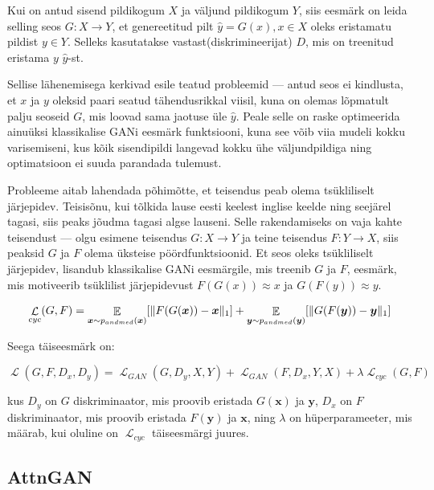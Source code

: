 \documentclass{vilgym}
\DeclareMathOperator{\EX}{\mathbb{E}}
\DeclareMathOperator{\loss}{\mathcal{L}}
\DeclarePairedDelimiter{\norm}{\lVert}{\rVert}
\begin{document}
	Kui on antud sisend pildikogum $ X $ ja väljund pildikogum $ Y $, siis eesmärk on leida selling seos $ G: X \rightarrow Y $, et genereetitud pilt $ \hat{y} = G(x), x \in X $ oleks eristamatu pildist $ y \in Y $. Selleks kasutatakse vastast(diskrimineerijat) $ D $, mis on treenitud eristama $ y $ $ \hat{y} $-st. 

	Sellise lähenemisega kerkivad esile teatud probleemid --- antud seos ei kindlusta, et $ x $ ja $ y $ oleksid paari seatud tähendusrikkal viisil, kuna on olemas lõpmatult palju seoseid $ G $, mis loovad sama jaotuse üle $ \hat{y} $. Peale selle on raske optimeerida ainuüksi klassikalise GANi eesmärk funktsiooni, kuna see võib viia mudeli kokku varisemiseni, kus kõik sisendipildi langevad kokku ühe väljundpildiga ning optimatsioon ei suuda parandada tulemust.

	Probleeme aitab lahendada põhimõtte, et teisendus peab olema tsükliliselt järjepidev. Teisisõnu, kui tõlkida lause eesti keelest inglise keelde ning seejärel tagasi, siis peaks jõudma tagasi algse lauseni. Selle rakendamiseks on vaja kahte teisendust --- olgu esimene teisendus $ G: X \rightarrow Y $ ja teine teisendus $F: Y \rightarrow X $, siis peaksid $ G $ ja $ F $ olema üksteise pöördfunktsioonid. Et seos oleks tsükliliselt järjepidev, lisandub klassikalise GANi eesmärgile, mis treenib $ G $ ja $ F $, eesmärk, mis motiveerib tsüklilist järjepidevust $ F(G(x)) \approx x $ ja $ G(F(y)) \approx y $.

	\begin{equation}
		\loss_{cyc}(G,F) = \EX_{\boldsymbol{x}\sim p_{andmed}(\boldsymbol{x})}[\norm{F(G(\boldsymbol{x})) - \boldsymbol{x}}_1] + \EX_{\boldsymbol{y}\sim p_{andmed}(\boldsymbol{y})}[\norm{G(F(\boldsymbol{y})) - \boldsymbol{y}}_1]
	\end{equation}

	Seega täiseesmärk on:

	\begin{equation}
		\loss(G, F, D_x, D_y) = \loss_{GAN}(G, D_y, X, Y) + \loss_{GAN}(F, D_x, Y, X) + \lambda \loss_{cyc}(G, F)
	\end{equation}

	kus $ D_y $ on $ G $ diskriminaator, mis proovib eristada $ G(\boldsymbol{x}) $ ja $ \boldsymbol{y} $, $ D_x $ on  $ F $ diskriminaator, mis proovib eristada $ F(\boldsymbol{y}) $ ja $ \boldsymbol{x} $, ning $ \lambda $ on hüperparameeter, mis määrab, kui oluline on $ \loss_{cyc} $ täiseesmärgi juures.

	\subsection{AttnGAN}
\end{document}
